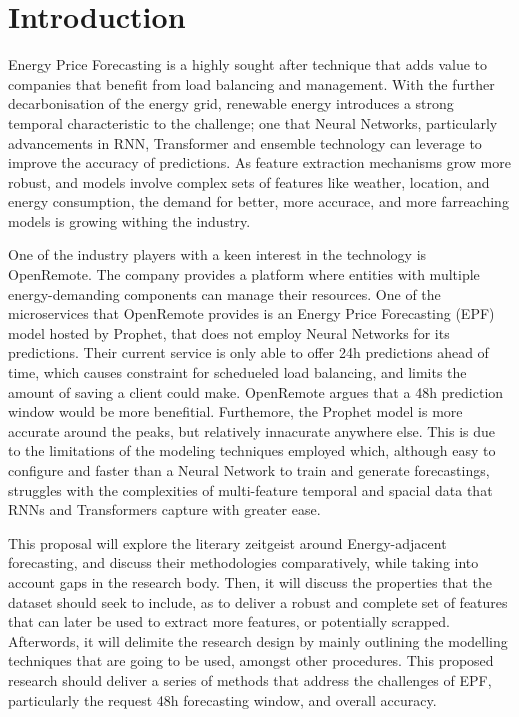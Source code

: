 \section{Introduction}
Energy Price Forecasting is a highly sought after technique that adds value to companies that benefit from load balancing and management. With the further decarbonisation of the energy grid, renewable energy introduces
a strong temporal characteristic to the challenge; one that Neural Networks, particularly advancements in RNN\cite{Aksu2026,Xu2025,Shao2021,Fang2023,Manero2018}, Transformer\cite{Kong2025,Wang2026,Oliveira2023,9756020} and ensemble\cite{math11030676,CHEN2025126302,Hussan2026-dy} technology can leverage to improve the accuracy of predictions. As feature extraction mechanisms grow more robust\cite{CHEN2025126302,Aksu2026,Xu2025,4494757,Shao2021},
and models involve complex sets of features like weather\cite{9788043, Wang2026}, location, and energy consumption\cite{4494757}, the demand for better, more accurace, and more farreaching models is growing withing the industry.

One of the industry players with a keen interest in the technology is OpenRemote. The company provides a platform where entities with multiple energy-demanding components can manage their resources. One of the microservices
that OpenRemote provides is an Energy Price Forecasting (EPF) model hosted by Prophet, that does not employ Neural Networks for its predictions\cite{Taylor2017}. Their current service is only able to offer 24h
predictions ahead of time, which causes constraint for schedueled load balancing, and limits the amount of saving a client could make. OpenRemote argues that a 48h prediction window would be more benefitial. Furthemore, the Prophet model is more accurate around the peaks, but 
relatively innacurate anywhere else. This is due to the limitations of the modeling techniques employed which, although easy to configure and faster than a Neural Network to train and generate forecastings, struggles 
with the complexities of multi-feature temporal and spacial data that RNNs and Transformers capture with greater ease.

This proposal will explore the literary zeitgeist around Energy-adjacent forecasting, and discuss their methodologies comparatively, while taking into account gaps in the research body. Then, it will discuss the
properties that the dataset should seek to include, as to deliver a robust and complete set of features that can later be used to extract more features, or potentially scrapped. Afterwords, it will 
delimite the research design by mainly outlining the modelling techniques that are going to be used, amongst other procedures.
This proposed research should deliver a series of methods that address the challenges of EPF, particularly the request 48h forecasting window, and overall accuracy.